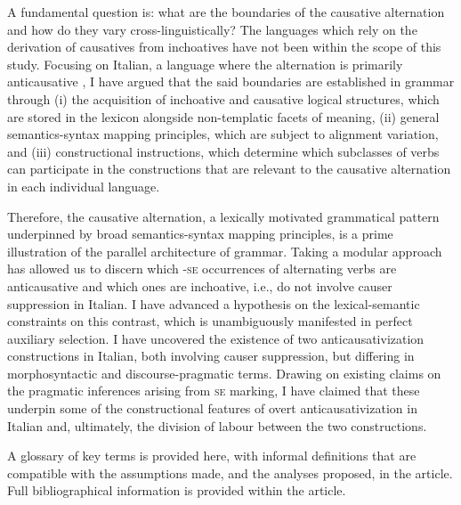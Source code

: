 \documentclass[output=paper,colorlinks,citecolor=brown
]{langscibook}
\begin{document}
A fundamental question is: what are the boundaries of the causative alternation and how do they vary cross-linguistically? The languages which rely on the derivation of causatives from inchoatives have not been within the scope of this study. Focusing on Italian, a language where the alternation is primarily anticausative \citep{haspelmath1993more}, I have argued that the said boundaries are established in grammar through (i) the acquisition of inchoative and causative logical structures, which are stored in the lexicon alongside non-templatic facets of meaning, (ii) general semantics-syntax mapping principles, which are subject to alignment variation, and (iii) constructional instructions, which determine which subclasses of verbs can participate in the constructions that are relevant to the causative alternation in each individual language.  

Therefore, the causative alternation, a lexically motivated grammatical pattern underpinned by broad semantics-syntax mapping principles, is a prime illustration of the parallel architecture of grammar. Taking a modular approach has allowed us to discern which -\textsc{se} occurrences of alternating verbs are anticausative and which ones are inchoative, i.e., do not involve causer suppression in Italian. I have advanced a hypothesis on the lexical-semantic constraints on this contrast, which is unambiguously manifested in perfect auxiliary selection. I have uncovered the existence of two anticausativization constructions in Italian, both involving causer suppression, but differing in morphosyntactic and discourse-pragmatic terms. Drawing on existing claims on the pragmatic inferences arising from \textsc{se} marking, I have claimed that these underpin some of the constructional features of overt anticausativization in Italian and, ultimately, the division of labour between the two constructions. 

\label{bentley:appendix:A}

A glossary of key terms is provided here, with informal definitions that are compatible with the assumptions made, and the analyses proposed, in the article. Full bibliographical information is provided within the article. 
\end{document}
